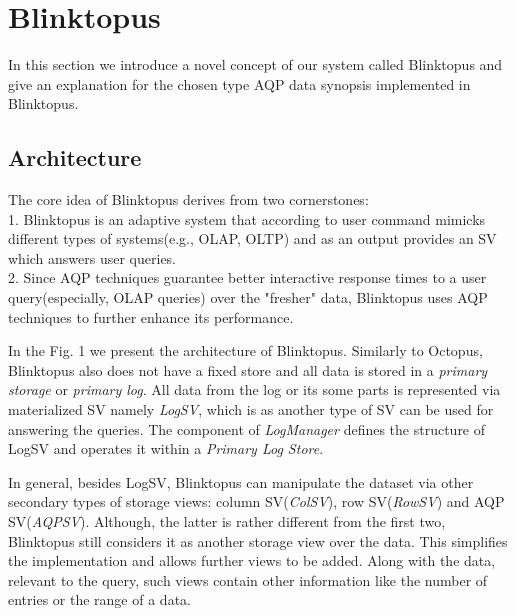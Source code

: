 \documentclass[10pt, conference, compsocconf]{IEEEtran}
\begin{document}
\section{Blinktopus}
In this section we introduce a novel concept of our system called Blinktopus and give an explanation for the chosen type AQP data synopsis implemented in Blinktopus.  

\subsection{Architecture}

The core idea of Blinktopus derives from two cornerstones:\\
1. Blinktopus is an adaptive system that according to user command mimicks different types of systems(e.g., OLAP, OLTP) and as an output provides an SV which answers user queries.\\
2. Since AQP techniques guarantee better interactive response times to a user query(especially, OLAP queries) over the "fresher" data, Blinktopus uses AQP techniques to further enhance its performance.

In the Fig. 1 we present the architecture of Blinktopus. Similarly to Octopus, Blinktopus also does not have a fixed store and all data is stored in a \textit{primary storage} or \textit{primary log}.
All data from the log or its some parts is represented via materialized SV namely \textit{LogSV}, which is as another type of SV can be used for answering the queries. The component of \textit{LogManager} defines the structure of LogSV and operates it within a \textit{Primary Log Store}. 

In general, besides LogSV, Blinktopus can manipulate the dataset via other secondary types of storage views: column SV(\textit{ColSV}), row SV(\textit{RowSV}) and AQP SV(\textit{AQPSV}). Although, the latter is rather different from the first two, Blinktopus still considers it as another storage view over the data. This simplifies the implementation and allows further views to be added. Along with the data, relevant to the query, such views contain other information like the number of entries or the range of a data. 
\end{document}
